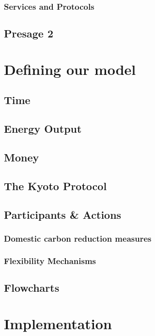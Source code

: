 \documentclass[]{article} %
\begin{document}
\subsubsection{Services and Protocols}

\subsection{Presage 2}

\section{Defining our model}

\subsection{Time}

\subsection{Energy Output}

\subsection{Money}

\subsection{The Kyoto Protocol}

\subsection{Participants \& Actions}

\subsubsection{Domestic carbon reduction measures}

\subsubsection{Flexibility Mechanisms}

\subsection{Flowcharts}

\section{Implementation}
\end{document}
